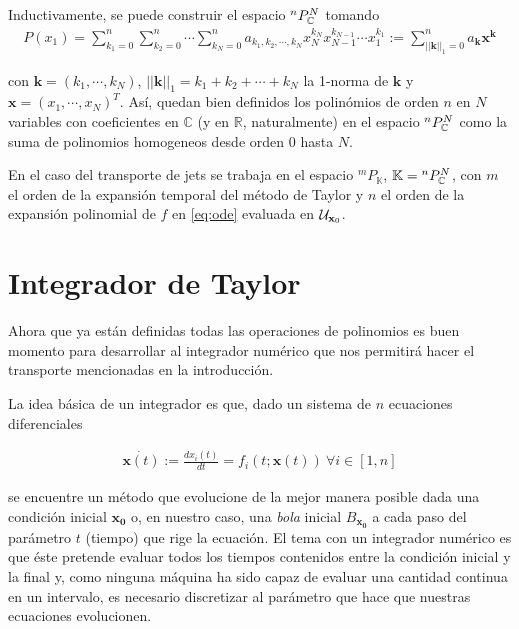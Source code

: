 Inductivamente, se puede construir el espacio ${^{n}P_{\mathbb{C}}^ N }$ tomando
\begin{align}
 P(x_1) = \sum_{k_{1}=0}^n\sum_{k_2=0}^n\cdots\sum_{k_N=0}^n a_{k_{1},k_{2},\cdots,k_{N}}x_N^{k_{N}}x_{N-1}^{k_{N-1}} \cdots x_1^{k_{1}} := \sum_{||\mathbf{k}||_{1}=0}^n a_{\mathbf{k}}\mathbf{x}^{\mathbf{k}}
\label{eq:pknN}
\end{align}

con $\mathbf{k} = (k_1,\cdots,k_N)$, $||\mathbf{k}||_1 = k_1+k_2+\cdots+k_N$ la 1-norma de $\mathbf{k}$ y $\mathbf{x} = (x_1,\cdots,x_N)^T$. Así, quedan bien definidos los polinómios de orden $n$ en $N$ variables con coeficientes en $\mathbb{C}$ (y en $\mathbb{R}$, naturalmente) en el espacio ${^{n}P_{\mathbb{C}}^ N }$ como la suma de polinomios homogeneos desde orden $0$ hasta $N$.


En el caso del transporte de jets se trabaja en el espacio ${^{m}P_{\mathbb{K}}}$, $\mathbb{K} = {^{n}P_{\mathbb{C}}^ N }$, con $m$ el orden de la expansión temporal del método de Taylor y $n$ el orden de la expansión polinomial de $f$ en \ref{eq:ode} evaluada en $\mathcal{U}_{\mathbf{x}_0}$. 

\section{Integrador de Taylor}

Ahora que ya están definidas todas las operaciones de polinomios es buen momento para desarrollar al integrador numérico que nos permitirá hacer el transporte mencionadas en la introducción.

La idea básica de un integrador es que, dado un sistema de $n$ ecuaciones diferenciales

\begin{align}
 \dot{\bm{x}(t)} := \frac{dx_i(t)}{dt} = f_i(t;\bm{x}(t)) \ \forall i \in [1,n]
 \label{eq: eqdif}
\end{align}

se encuentre un método que evolucione de la mejor manera posible dada una condición inicial $\bm{x_0}$ o, en nuestro caso, una \textit{bola} inicial {$B_{\bm{x_0}}$} a cada paso del parámetro $t$ (tiempo) que rige la ecuación. El tema con un integrador numérico es que éste pretende evaluar todos los tiempos contenidos entre la condición inicial y la final y, como ninguna máquina ha sido capaz de evaluar una cantidad continua en un intervalo, es necesario discretizar al parámetro que hace que nuestras ecuaciones evolucionen.

